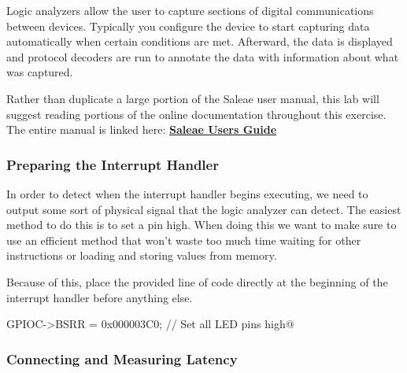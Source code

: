 \documentclass[11pt,fleqn]{book} %
\makeatletter
\newcommand{\ilcode}[1]{
    \smallskip
    \colorbox{gray!20!white}{
        \centering
        \parbox{\linewidth-2\fboxsep}{
            \lstinline@#1@
        }
    }
}
\makeatother
\begin{document}
Logic analyzers allow the user to capture sections of digital communications between devices. Typically you configure the device to start capturing data automatically when certain conditions are met. Afterward, the data is displayed and protocol decoders are run to annotate the data with information about what was captured.

Rather than duplicate a large portion of the Saleae user manual, this lab will suggest reading portions of the online documentation throughout this exercise. The entire manual is linked here:
\href{http://support.saleae.com/hc/en-us/sections/201990573-saleae-users-guide}{\textbf{Saleae Users Guide}}
 
\subsubsection{Preparing the Interrupt Handler} 
In order to detect when the interrupt handler begins executing, we need to output some sort of physical signal that the logic analyzer can detect. The easiest method to do this is to set a pin high. When doing this we want to make sure to use an efficient method that won't waste too much time waiting for other instructions or loading and storing values from memory. 

Because of this, place the provided line of code directly at the beginning of the interrupt handler before anything else. 
 
\ilcode{GPIOC->BSRR = 0x000003C0;   // Set all LED pins high}
\subsubsection{Connecting and Measuring Latency}
 
\end{document}
